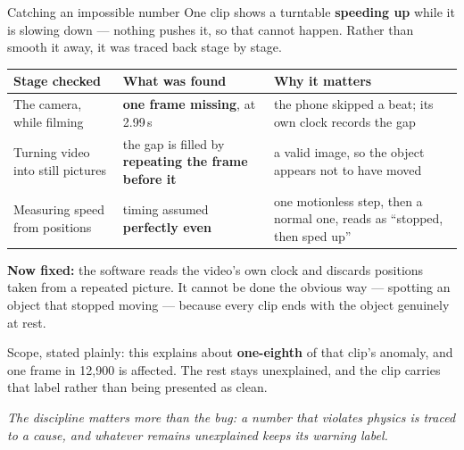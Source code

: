 \documentclass[aspectratio=169,10pt]{beamer}
\newcommand{\takeaway}[1]{\vfill{\footnotesize\itshape\color{cGrey}#1\par}}
\begin{document}
\begin{frame}{Catching an impossible number}
\small
One clip shows a turntable \textbf{speeding up} while it is slowing down --- nothing pushes it, so
that cannot happen. Rather than smooth it away, it was traced back stage by stage.
\vspace{0.3em}
\scriptsize
\renewcommand{\arraystretch}{1.3}
\begin{tabular}{@{}p{4.3cm}p{4.0cm}p{5.2cm}@{}}
\toprule
\rowcolor{cMeas!12}
\textbf{Stage checked} & \textbf{What was found} & \textbf{Why it matters} \\
\midrule
The camera, while filming &
\textbf{one frame missing}, at 2.99\,s &
the phone skipped a beat; its own clock records the gap \\
Turning video into still pictures &
the gap is filled by \textbf{repeating the frame before it} &
a valid image, so the object appears not to have moved \\
Measuring speed from positions &
timing assumed \textbf{perfectly even} &
one motionless step, then a normal one, reads as ``stopped, then sped up'' \\
\bottomrule
\end{tabular}
\vspace{0.5em}

\scriptsize \textbf{\color{cApp}Now fixed:} the software reads the video's own clock and discards
positions taken from a repeated picture. It cannot be done the obvious way --- spotting an object
that stopped moving --- because every clip ends with the object genuinely at rest.
\vspace{0.2em}

\scriptsize\color{cGrey}Scope, stated plainly: this explains about \textbf{one-eighth} of that
clip's anomaly, and one frame in 12{,}900 is affected. The rest stays unexplained, and the clip
carries that label rather than being presented as clean.
\takeaway{The discipline matters more than the bug: a number that violates physics is traced to a
cause, and whatever remains unexplained keeps its warning label.}
\end{frame}
\end{document}
